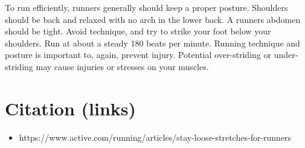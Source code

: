 \documentclass[letterpaper]{article}
\def\tightlist{}
\begin{document}
To run efficiently, runners generally should keep a proper posture. Shoulders should be back and relaxed with no arch in the lower back. A runner\textquotesingle s abdomen should be tight. Avoid technique, and try to strike your foot below your shoulders. Run at about a steady 180 beats per minute. Running technique and posture is important to, again, prevent injury. Potential over-striding or under-striding may cause injuries or stresses on your muscles.

\section{Citation (links)}\label{citation-links}

\begin{itemize}
\tightlist
\item
  https://www.active.com/running/articles/stay-loose-stretches-for-runners
\end{itemize}

\newpage
\end{document}
